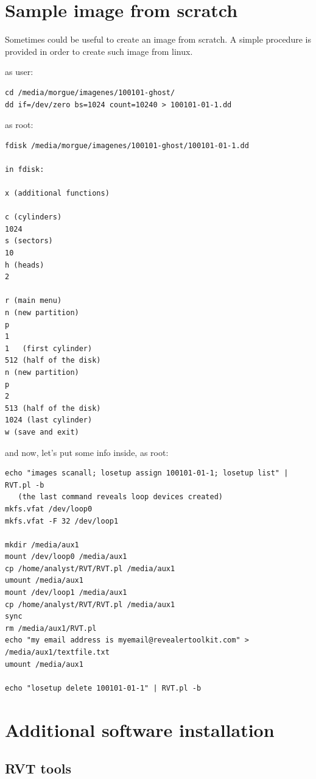 \documentclass[a4paper,11pt,oneside]{report}
\begin{document}
\chapter{Sample image from scratch} \label{anx:scratch}

Sometimes could be useful to create an image from scratch. A simple procedure is provided in order to create such image from linux.

as user:

\begin{verbatim}
cd /media/morgue/imagenes/100101-ghost/
dd if=/dev/zero bs=1024 count=10240 > 100101-01-1.dd
\end{verbatim}

as root:

\begin{verbatim}
fdisk /media/morgue/imagenes/100101-ghost/100101-01-1.dd

in fdisk:

x (additional functions)

c (cylinders)
1024
s (sectors)
10
h (heads)
2

r (main menu)
n (new partition)
p 
1
1   (first cylinder)
512 (half of the disk)
n (new partition)
p 
2
513 (half of the disk)
1024 (last cylinder)
w (save and exit)
\end{verbatim}

and now, let's put some info inside, as root:

\begin{verbatim}
echo "images scanall; losetup assign 100101-01-1; losetup list" | RVT.pl -b
   (the last command reveals loop devices created)
mkfs.vfat /dev/loop0
mkfs.vfat -F 32 /dev/loop1   

mkdir /media/aux1
mount /dev/loop0 /media/aux1
cp /home/analyst/RVT/RVT.pl /media/aux1
umount /media/aux1
mount /dev/loop1 /media/aux1
cp /home/analyst/RVT/RVT.pl /media/aux1
sync
rm /media/aux1/RVT.pl
echo "my email address is myemail@revealertoolkit.com" > /media/aux1/textfile.txt
umount /media/aux1

echo "losetup delete 100101-01-1" | RVT.pl -b
\end{verbatim}




\chapter{Additional software installation}

\section{RVT tools} \label{anx:rvttools}
\end{document}
